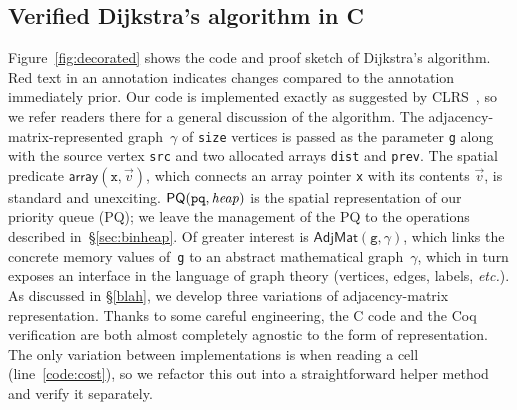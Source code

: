 \subsection{Verified Dijkstra's algorithm in C}
\label{sec:dijkoverview}

Figure~\ref{fig:decorated} shows the code and proof
sketch of Dijkstra's algorithm.  
{\color{red}Red} text in an annotation indicates changes compared to the
annotation immediately prior.
Our code is implemented exactly
as suggested by CLRS~\cite{clrs}, so we refer readers there for a
general discussion of the algorithm.
The adjacency-matrix-represented graph~$\gamma$ of \texttt{size} vertices
is passed as the parameter \texttt{g} along with the source vertex \texttt{src}
and two allocated arrays \texttt{dist} and \texttt{prev}.
The spatial predicate $\mathsf{array}(\texttt{x},\vec{v})$, which connects 
an array pointer \texttt{x} with its contents $\vec{v}$, is standard and unexciting.
$\mathsf{PQ}(\texttt{pq},\mathit{heap})$ is the spatial 
representation of our priority queue (PQ);
we leave the management of the PQ to the operations described in~\S\ref{sec:binheap}.
Of greater interest is $\mathsf{AdjMat}(\texttt{g},\gamma)$, which
links the concrete memory values of~\texttt{g} to an abstract mathematical
graph~$\gamma$, which in turn exposes an interface in the 
language of graph theory (vertices, edges, labels, \emph{etc.}).
As discussed in \S\ref{blah}, we develop three variations of 
adjacency-matrix representation. 
Thanks to some careful engineering, the C code and 
the Coq verification are both almost completely agnostic to 
the form of representation. The only variation between implementations 
is when reading a cell (line~\ref{code:cost}), so we 
refactor this out into a straightforward helper method and 
verify it separately.






